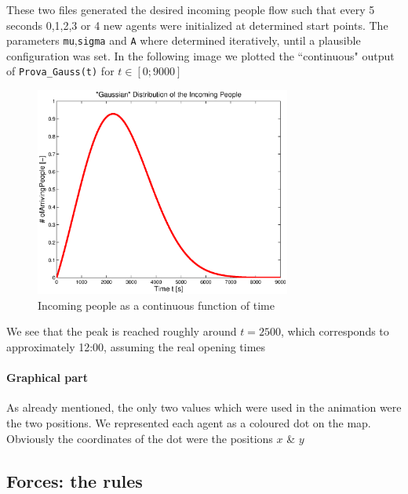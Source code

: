 \documentclass[11pt]{article}
\begin{document}
These two files generated the desired incoming people flow such that every 5 seconds 0,1,2,3 or 4 new agents were initialized at determined start points. The parameters \verb"mu",\verb"sigma" and \verb"A" where determined iteratively, until a plausible configuration was set. In the following image we plotted the ``continuous" output of \verb"Prova_Gauss(t)" for $t\in[0;9000]$

\begin{figure}[h]
 	\centering
		\includegraphics[width = 0.75\textwidth]{Images/GaussianDist.eps}
 	\caption{Incoming people as a continuous function of time}
  	\label{GauDis}
\end{figure}

We see that the peak is reached roughly around $t = 2500$, which corresponds to approximately 12:00, assuming the real opening times

\paragraph{Graphical part} As already mentioned, the only two values which were used in the animation were the two positions. We represented each agent as a coloured dot on the map. Obviously the coordinates of the dot were the positions $x$ \& $y$

\subsection{Forces: the rules}
\end{document}
